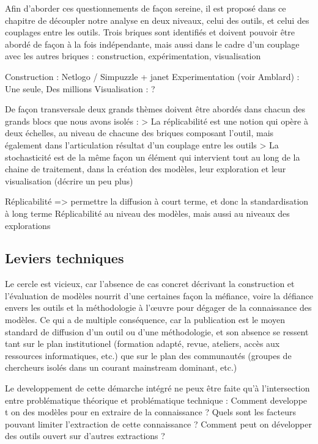 Afin d'aborder ces questionnements de façon sereine, il est proposé dans ce chapitre de découpler notre analyse en deux niveaux, celui des outils, et celui des couplages entre les outils. Trois briques sont identifiés et doivent pouvoir être abordé de façon à la fois indépendante, mais aussi dans le cadre d'un couplage avec les autres briques : construction, expérimentation, visualisation

Construction : Netlogo / Simpuzzle + janet
Experimentation (voir Amblard) : Une seule, Des millions
Visualisation : ?

De façon transversale deux grands thèmes doivent être abordés dans chacun des grands blocs que nous avons isolés :
>  La réplicabilité est une notion qui opère à deux échelles, au niveau de chacune des briques composant l'outil, mais également dans l'articulation résultat d'un couplage entre les outils
> La stochasticité est de la même façon un élément qui intervient tout au long de la chaine de traitement, dans la création des modèles, leur exploration et leur visualisation (décrire un peu plus)

Réplicabilité => permettre la diffusion à court terme, et donc la standardisation à long terme
Réplicabilité au niveau des modèles, mais aussi au niveaux des explorations


\subsection{Leviers techniques}


Le cercle est vicieux, car l'absence de cas concret décrivant la construction et l'évaluation de modèles nourrit d'une certaines façon la méfiance, voire la défiance envers les outils et la méthodologie à l’œuvre pour dégager de la connaissance des modèles. Ce qui a de multiple conséquence, car la publication est le moyen standard de diffusion d'un outil ou d'une méthodologie, et son absence se ressent tant sur le plan institutionel (formation adapté, revue, ateliers, accès aux ressources informatiques, etc.) que sur le plan des communautés (groupes de chercheurs isolés dans un courant mainstream dominant, etc.)

Le developpement de cette démarche intégré ne peux être faite qu'à l'intersection entre problématique théorique et problématique technique : Comment developpe t on des modèles pour en extraire de la connaissance ? Quels sont les facteurs pouvant limiter l'extraction de cette connaissance ? Comment peut on développer des outils ouvert sur d'autres extractions ?

